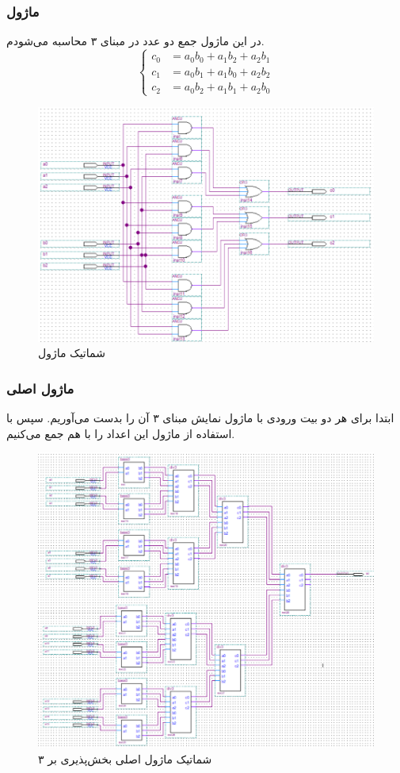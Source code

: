 \documentclass{perassignments}
\begin{document}
	\subsubsection{ماژول }
	در این ماژول جمع دو عدد در مبنای ۳ محاسبه می‌شودم.
	\begin{equation*}
		\begin{cases}
			c_0 &= a_0b_0 + a_1 b_2 + a_2 b_1\\
			c_1 &= a_0b_1 + a_1b_0 + a_2b_2\\
			c_2 &= a_0b_2 + a_1b_1 + a_2 b_0
		\end{cases}
	\end{equation*}
		\begin{figure}[H]
		\centering
		\includegraphics[width = 0.8 \textwidth]{graphics/div3.png}
		\caption{شماتیک ماژول }
	\end{figure}
	\subsubsection{ماژول اصلی}
	ابتدا برای هر دو بیت ورودی با ماژول 
	نمایش مبنای ۳ آن را بدست می‌آوریم. سپس با استفاده از ماژول 
	این اعداد را با هم جمع می‌کنیم.
	\begin{figure}[H]
		\centering
		\includegraphics[width = 0.8 \textwidth]{graphics/lab3.png}
		\caption{شماتیک ماژول اصلی بخش‌پذیری بر ۳}
	\end{figure}
\end{document}
